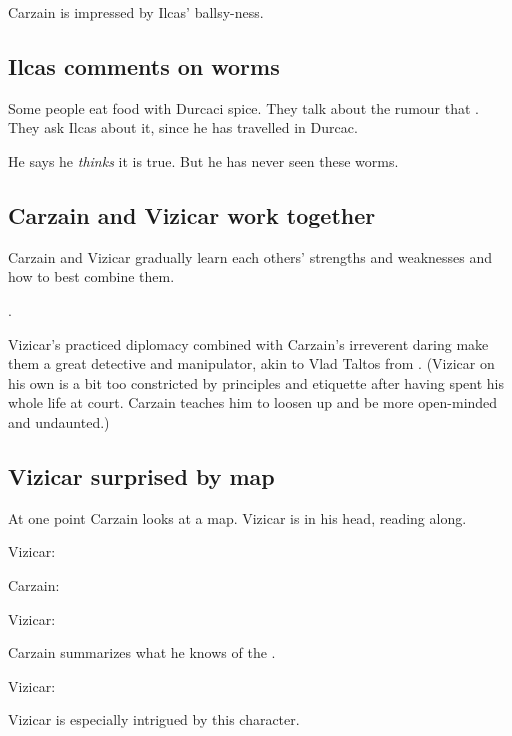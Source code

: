 Carzain is impressed by Ilcas' ballsy-ness. 









\subsection{Ilcas comments on worms}
Some people eat food with Durcaci spice. 
They talk about the rumour that . 
They ask Ilcas about it, since he has travelled in Durcac. 

He says he \emph{thinks} it is true. 
But he has never seen these worms. 









\subsection{Carzain and Vizicar work together}
Carzain and Vizicar gradually learn each others' strengths and weaknesses and how to best combine them. 

. 

Vizicar's practiced diplomacy combined with Carzain's irreverent daring make them a great detective and manipulator, akin to Vlad Taltos from . 
(Vizicar on his own is a bit too constricted by principles and etiquette after having spent his whole life at court. Carzain teaches him to loosen up and be more open-minded and undaunted.)







\subsection{Vizicar surprised by map}
At one point Carzain looks at a map. 
Vizicar is in his head, reading along. 

\begin{prose}
  Vizicar: 
  
  Carzain: 
  
  Vizicar: 
  
  Carzain summarizes what he knows of the \Darkfall. 
  
  Vizicar: 
  
  Vizicar is especially intrigued by this  character. 
\end{prose}







